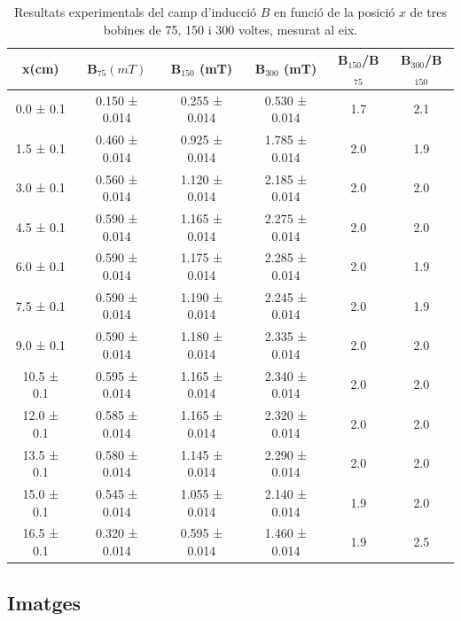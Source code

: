 \documentclass[11pt]{article}
\numberwithin{equation}{section}
\numberwithin{figure}{section}
\numberwithin{table}{section}
\begin{document}
\begin{table}[H]
    \centering
        \begin{tabular}{|c|c|c|c|c|c|}
            \hline
            x(cm)	&	B$_{75}(mT)$   & B$_{150}$ (mT)    & B$_{300}$ (mT) &	 B$_{150}$/B$_{75}$ & B$_{300}$/B$_{150}$ \\\hline
            0.0 ± 0.1 	&	0.150 ± 0.014   & 0.255 ± 0.014     & 0.530 ± 0.014     & 1.7  & 2.1
	    \\\hline
            1.5 ± 0.1	&	0.460 ± 0.014   & 0.925 ± 0.014     & 1.785 ± 0.014     & 2.0  & 1.9
	\\\hline
            3.0 ± 0.1	&	0.560 ± 0.014   & 1.120 ± 0.014     & 2.185 ± 0.014     & 2.0  & 2.0
	\\\hline
            4.5 ± 0.1	&	0.590 ± 0.014   & 1.165 ± 0.014     & 2.275 ± 0.014     & 2.0  & 2.0
	\\\hline
            6.0 ± 0.1	&	0.590 ± 0.014   & 1.175 ± 0.014     & 2.285 ± 0.014     & 2.0  & 1.9
	\\\hline
            7.5 ± 0.1	&	0.590 ± 0.014   & 1.190 ± 0.014     & 2.245 ± 0.014     & 2.0  & 1.9
	\\\hline
            9.0 ± 0.1	&	0.590 ± 0.014   & 1.180 ± 0.014     & 2.335 ± 0.014     & 2.0  & 2.0
	\\\hline
            10.5 ± 0.1	&	0.595 ± 0.014   & 1.165 ± 0.014     & 2.340 ± 0.014     & 2.0  & 2.0
	\\\hline
            12.0 ± 0.1  &   0.585 ± 0.014   & 1.165 ± 0.014     & 2.320 ± 0.014     & 2.0  & 2.0
        \\\hline
            13.5 ± 0.1  &   0.580 ± 0.014   & 1.145 ± 0.014     & 2.290 ± 0.014     & 2.0  & 2.0
        \\\hline
            15.0 ± 0.1  &   0.545 ± 0.014   & 1.055 ± 0.014     & 2.140 ± 0.014     & 1.9  & 2.0
        \\\hline
            16.5 ± 0.1  &   0.320 ± 0.014   & 0.595 ± 0.014     & 1.460 ± 0.014     & 1.9  & 2.5
        \\\hline
        \end{tabular}
    \caption{Resultats experimentals del camp d'inducció $B$ en funció de la posició $x$ de tres bobines de 75, 150 i 300 voltes, mesurat al eix.}
    \label{tab: taula Bx}
\end{table}


\subsection{Imatges} \label{sec: imatges}
\end{document}
